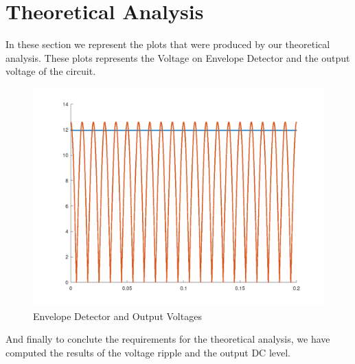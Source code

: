 \section{Theoretical Analysis}
\label{sec:analysis}

In these section we represent the plots that were produced by our theoretical analysis. These plots represents the Voltage on Envelope Detector and the output voltage of the circuit.



\FloatBarrier
\begin{figure}
  \includegraphics[width=\linewidth]{Condensador.png}
  \caption{Envelope Detector and Output Voltages}
  \label{fig:theoplots}
\end{figure}
\FloatBarrier

And finally to conclute the requirements for the theoretical analysis, we have computed the results of the voltage ripple and the output DC level.










